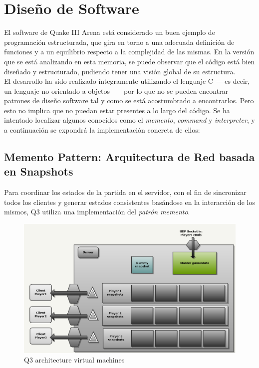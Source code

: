 \documentclass[a4paper,12pt]{report}
\begin{document}
	
	
	\newpage
	\section{Diseño de Software}
	
	El software de Quake III Arena está considerado un buen ejemplo de programación estructurada, que gira en torno a una adecuada definición de funciones y a un equilibrio respecto a la complejidad de las mismas. En la versión que se está analizando en esta memoria, se puede observar que el código está bien diseñado y estructurado, pudiendo tener una visión global de su estructura.\\
	
	El desarrollo ha sido realizado íntegramente utilizando el lenguaje C \,---\,es decir, un lenguaje no orientado a objetos \,---\, por lo que no se pueden encontrar patrones de diseño software tal y como se está acostumbrado a encontrarlos. Pero esto no implica que no puedan estar presentes a lo largo del código. Se ha intentado localizar algunos conocidos como el \textit{memento}, \textit{command} y \textit{interpreter}, y a continuación se expondrá la implementación concreta de ellos:\\
	
    \subsection{Memento Pattern: Arquitectura de Red basada en Snapshots}
	Para coordinar los estados de la partida en el servidor, con el fin de sincronizar todos los clientes y generar estados consistentes basándose en la interacción de los mismos, Q3 utiliza una implementación del \textit{patrón memento}.\\
	
	\begin{center}
		\begin{figure}[h]
			\includegraphics[width=1\textwidth]{images/q3_network_arch}
			\caption{Q3 architecture virtual machines}
			\label{figq3network}
		\end{figure}
	\end{center}
\end{document}
